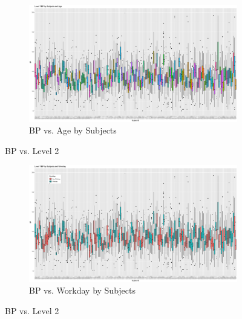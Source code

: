 \documentclass[12pt,twoside,leqno,fleqn,letterpaper]{article}
\theoremstyle{definition}
\theoremstyle{definition}
\begin{document}
\begin{appendices}
    \begin{figure}[h] 
        \centering
        \begin{subfigure}[b]{\textwidth}
            \centering
            \includegraphics[width=\textwidth]{pics/bp by id and age.png}
            \caption{BP vs. Age by Subjects}
            \label{fig: bp v id and age}
        \end{subfigure}
        \caption{BP vs. Level 2}
        \label{fig: bp v id and level2_1}
    \end{figure}

    \begin{figure}[h] \ContinuedFloat
        \centering
        \begin{subfigure}[b]{\textwidth}
            \centering
            \includegraphics[width=\textwidth]{pics/bp by id and day.png}
            \caption{BP vs. Workday by Subjects}
            \label{fig: bp v id and day}
        \end{subfigure}
        \caption{BP vs. Level 2}
        \label{fig: bp v id and level2_2}
    \end{figure}


\end{appendices}
\end{document}
